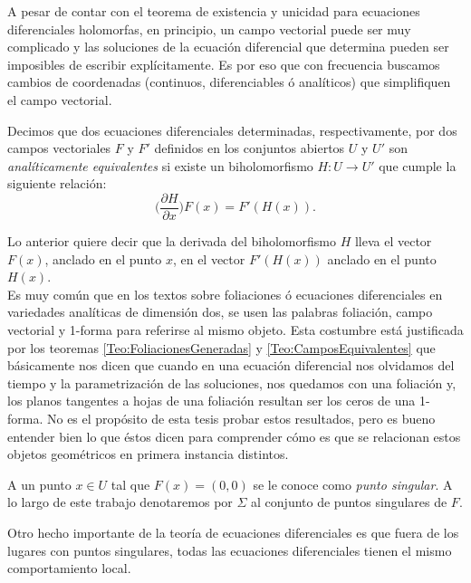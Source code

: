 A pesar de contar con el teorema de existencia y unicidad para ecuaciones diferenciales holomorfas, en principio, un campo vectorial puede ser muy complicado y las soluciones de la ecuación diferencial que determina pueden ser imposibles de escribir explícitamente. Es por eso que con frecuencia buscamos cambios de coordenadas (continuos, diferenciables ó analíticos) que simplifiquen el campo vectorial.

\begin{defn}
\label{Def:EquivalenciaAnalitica}
Decimos que dos ecuaciones diferenciales determinadas, respectivamente, por dos campos vectoriales $F$ y $F'$ definidos en los conjuntos abiertos $U$ y $U'$ son \emph{analíticamente equivalentes} si existe un biholomorfismo $H\colon U \rightarrow U'$ que cumple la siguiente relación:
\begin{equation*}
\label{EquivalenciaAnalitica}
\Big(\frac{\partial H}{\partial x}\Big)F(x)=F'(H(x)).
\end{equation*}
\end{defn}

Lo anterior quiere decir que la derivada del biholomorfismo $H$ lleva el vector $F(x)$, anclado en el punto $x$, en el vector $F'(H(x))$ anclado en el punto $H(x)$.\\

Es muy común que en los textos sobre foliaciones ó ecuaciones diferenciales en variedades analíticas de dimensión dos, se usen las palabras foliación, campo vectorial y 1-forma para referirse al mismo objeto. Esta costumbre está justificada por los teoremas \ref{Teo:FoliacionesGeneradas} y \ref{Teo:CamposEquivalentes} que básicamente nos dicen que cuando en una ecuación diferencial nos olvidamos del tiempo y la parametrización de las soluciones, nos quedamos con una foliación y, los planos tangentes a hojas de una foliación resultan ser los ceros de una 1-forma. No es el propósito de esta tesis probar estos resultados, pero es bueno entender bien lo que éstos dicen para comprender cómo es que se relacionan estos objetos geométricos en primera instancia distintos.\\
\begin{defn}
\label{Def:PuntoSingular}
A un punto $x\in U$ tal que $F(x)=(0,0)$ se le conoce como \emph{punto singular}. A lo largo de este trabajo denotaremos por $\Sigma$ al conjunto de puntos singulares de $F$.
\end{defn}
 Otro hecho importante de la teoría de ecuaciones diferenciales es que fuera de los lugares con puntos singulares, todas las ecuaciones diferenciales tienen el mismo comportamiento local.

